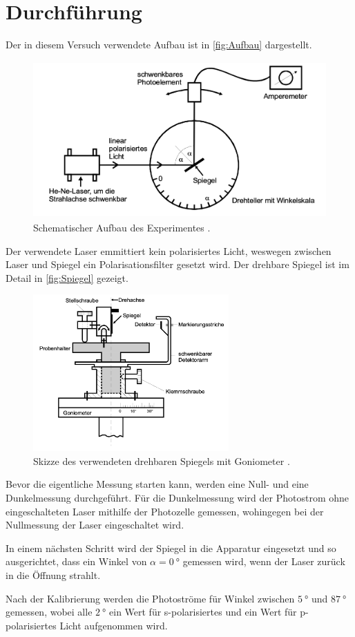 \section{Durchführung}
\label{sec:Durchführung}
Der in diesem Versuch verwendete Aufbau ist in \autoref{fig:Aufbau} dargestellt.
\begin{figure}[H]
    \centering
    \includegraphics[height=6cm]{content/pics/Aufbau.png}
    \caption{Schematischer Aufbau des Experimentes \cite{v407}.}
    \label{fig:Aufbau}
\end{figure}
Der verwendete Laser emmittiert kein polarisiertes Licht, weswegen zwischen Laser und
Spiegel ein Polarisationsfilter gesetzt wird. Der drehbare Spiegel ist im Detail in 
\autoref{fig:Spiegel} gezeigt.
\begin{figure}[H]
    \centering
    \includegraphics[height=6cm]{content/pics/Goniometer.png}
    \caption{Skizze des verwendeten drehbaren Spiegels mit Goniometer \cite{v407}.}
    \label{fig:Spiegel}
\end{figure}

Bevor die eigentliche Messung starten kann, werden eine Null- und eine Dunkelmessung durchgeführt.
Für die Dunkelmessung wird der Photostrom ohne eingeschalteten Laser mithilfe der Photozelle gemessen, wohingegen bei
der Nullmessung der Laser eingeschaltet wird.

In einem nächsten Schritt wird der Spiegel in die Apparatur eingesetzt und so ausgerichtet, dass ein Winkel von
$\alpha = \qty{0}{\degree}$ gemessen wird, wenn der Laser zurück in die Öffnung strahlt.

Nach der Kalibrierung werden die Photoströme für Winkel zwischen $\qty{5}{\degree}$ und $\qty{87}{\degree}$ gemessen,
wobei alle $\qty{2}{\degree}$ ein Wert für s-polarisiertes und ein Wert für p-polarisiertes Licht aufgenommen wird.
